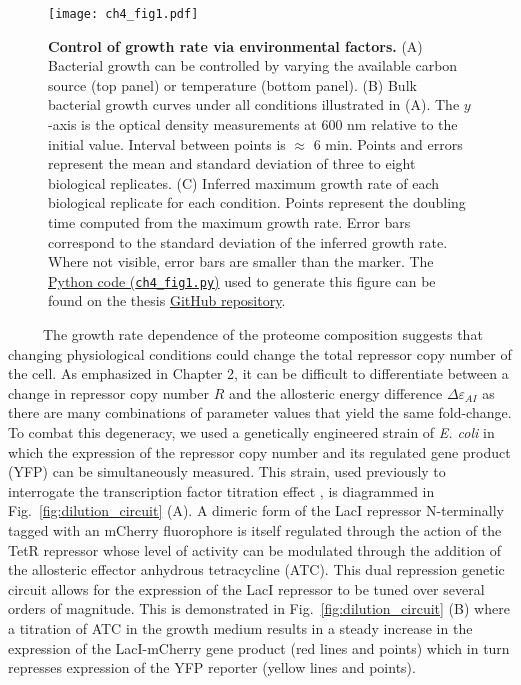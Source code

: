 \documentclass[12pt]{caltech_thesis}
\begin{document}
\hypertarget{fig:growth_control}{%
\begin{figure}
\centering
\texttt{[image: ch4\_fig1.pdf]}
\caption[{Controlling physiological state of \emph{E. coli} via growth
rate modulation by environmental factors.}]{\textbf{Control of growth
rate via environmental factors.} (A) Bacterial growth can be controlled
by varying the available carbon source (top panel) or temperature
(bottom panel). (B) Bulk bacterial growth curves under all conditions
illustrated in (A). The \(y\)-axis is the optical density measurements
at 600 nm relative to the initial value. Interval between points is
\(\approx\) 6 min. Points and errors represent the mean and standard
deviation of three to eight biological replicates. (C) Inferred maximum
growth rate of each biological replicate for each condition. Points
represent the doubling time computed from the maximum growth rate. Error
bars correspond to the standard deviation of the inferred growth rate.
Where not visible, error bars are smaller than the marker. The
\href{https://github.com/gchure/phd/blob/master/src/chapter_04/code/ch4_fig1.py}{Python
code (\texttt{ch4\_fig1.py})} used to generate this figure can be found
on the thesis \href{https://github.com/gchure/phd}{GitHub repository}.}
\label{fig:growth_control}
\end{figure}
}

~~~~~The growth rate dependence of the proteome composition suggests
that changing physiological conditions could change the total repressor
copy number of the cell. As emphasized in Chapter 2, it can be difficult
to differentiate between a change in repressor copy number \(R\) and the
allosteric energy difference \(\Delta\varepsilon_{AI}\) as there are
many combinations of parameter values that yield the same fold-change.
To combat this degeneracy, we used a genetically engineered strain of
\emph{E. coli} in which the expression of the repressor copy number and
its regulated gene product (YFP) can be simultaneously measured. This
strain, used previously to interrogate the transcription factor
titration effect \autocite{brewster2014}, is diagrammed in
Fig.~\ref{fig:dilution_circuit} (A). A dimeric form of the LacI
repressor N-terminally tagged with an mCherry fluorophore is itself
regulated through the action of the TetR repressor whose level of
activity can be modulated through the addition of the allosteric
effector anhydrous tetracycline (ATC). This dual repression genetic
circuit allows for the expression of the LacI repressor to be tuned over
several orders of magnitude. This is demonstrated in
Fig.~\ref{fig:dilution_circuit} (B) where a titration of ATC in the
growth medium results in a steady increase in the expression of the
LacI-mCherry gene product (red lines and points) which in turn represses
expression of the YFP reporter (yellow lines and points).
\end{document}
